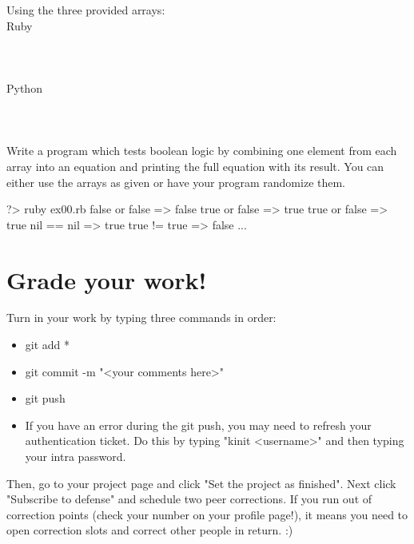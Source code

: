 \documentclass{42-en}
\begin{document}
Using the three provided arrays:\\

Ruby\\
\\
\noindent [or,or,or,==,!=,==,and,==,!=,and,!=,and]\\
\\

Python\\
\\
\noindent [or,or,or,==,!=,==,and,==,!=,and,!=,and]\\
\\

Write a program which tests boolean logic by combining one element from each array into an equation and printing the full equation with its result. You can either use the arrays as given or have your program randomize them.

\begin{42console}
	?> ruby ex00.rb
	false or false => false
	true or false => true
	true or false => true
	nil == nil => true
	true != true => false
	...
\end{42console}



\chapter{Grade your work!}

Turn in your work by typing three commands in order: 
\begin{itemize}
	\item git add *
	\item git commit -m "<your comments here>"
	\item git push
	\item If you have an error during the git push, you may need to refresh your authentication ticket. Do this by typing "kinit <username>" and then typing your intra password.
\end{itemize}

Then, go to your project page and click "Set the project as finished".
Next click "Subscribe to defense" and schedule two peer corrections.
If you run out of correction points (check your number on your profile page!), it means you need to open correction slots and correct other people in return. :)
\end{document}
